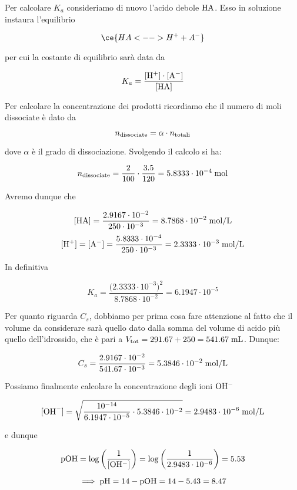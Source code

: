 \begin{soluzione}
Per calcolare $K_a$ consideriamo di nuovo l'acido debole $\rm HA$. Esso in soluzione instaura l'equilibrio

$$\ce{HA <--> H^+ + A^-}$$

per cui la costante di equilibrio sarà data da

$$K_a=\rm \frac{[H^+] \cdot [A^-]}{[HA]}$$

Per calcolare la concentrazione dei prodotti ricordiamo che il numero di moli dissociate è dato da

$$n_{\rm dissociate}=\alpha \cdot n_{\rm totali}$$

dove $\alpha$ è il grado di dissociazione. Svolgendo il calcolo si ha:

$$n_{\rm dissociate}
=\frac{2}{100} \cdot \frac{3.5}{120}
=5.8333 \cdot 10^{-4} \; \rm mol$$

Avremo dunque che

$$\rm [HA]=\frac{2.9167 \cdot 10^{-2}}{250 \cdot 10^{-3}}=8.7868 \cdot 10^{-2} \; mol/L$$
$$\rm [H^+]=[A^-]=\frac{5.8333 \cdot 10^{-4}}{250 \cdot 10^{-3}}=2.3333 \cdot 10^{-3} \; mol/L$$

In definitiva

$$K_a=\frac{\big( 2.3333 \cdot 10^{-3} \big)^2}{8.7868 \cdot 10^{-2}}=6.1947 \cdot 10^{-5}$$

Per quanto riguarda $C_s$, dobbiamo per prima cosa fare attenzione al fatto che il volume da considerare sarà quello dato dalla somma del volume di acido più quello dell'idrossido, che è pari a $V_{\rm tot}=291.67 + 250=541.67 \; \rm mL$. Dunque:

$$C_s=\frac{2.9167 \cdot 10^{-2}}{541.67 \cdot 10^{-3}}=5.3846 \cdot 10^{-2} \; \rm mol/L$$

Possiamo finalmente calcolare la concentrazione degli ioni $\rm OH^-$

$$[\text{OH}^-]
=\sqrt{\frac{10^{-14}}{6.1947 \cdot 10^{-5}} \cdot 5.3846 \cdot 10^{-2}}
=2.9483 \cdot 10^{-6} \; \rm mol/L$$

e dunque

$$\rm pOH=\log\left(\frac{1}{[OH^-]}\right)=\log\left(\frac{1}{2.9483 \cdot 10^{-6}}\right)=5.53$$

$$\implies \rm pH=14 - pOH=14 - 5.43=8.47$$
\end{soluzione}

\newpage

